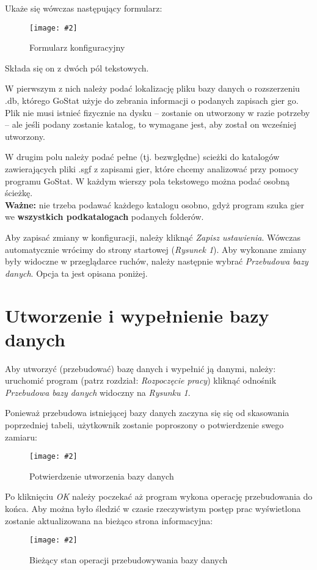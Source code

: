 \documentclass[10pt,leqno]{article}
\newcommand{\myimage}[3]{
  \begin{figure}[h!]
    \centering
      \texttt{[image: \#2]}
  \caption{#3}
  \end{figure}
}
\begin{document}
Ukaże się wówczas następujący formularz:

\myimage{0.4}{formularz.png}{Formularz konfiguracyjny}

Składa się on z dwóch pól tekstowych. 

W pierwszym z nich należy podać lokalizację pliku bazy danych o rozszerzeniu .db, którego GoStat użyje do zebrania informacji o podanych zapisach gier go.
Plik nie musi istnieć fizycznie na dysku -- zostanie on utworzony w razie potrzeby -- ale jeśli podany zostanie katalog, to wymagane jest, aby został on
wcześniej utworzony.

W drugim polu należy podać pełne (tj. bezwględne) scieżki do katalogów zawierających pliki .sgf z zapisami gier, które chcemy analizować przy pomocy
programu GoStat. W każdym wierszy pola tekstowego można podać osobną ścieżkę. \\
\textbf{Ważne:} nie trzeba podawać każdego katalogu osobno, gdyż program szuka gier we \textbf{wszystkich podkatalogach} podanych folderów.

Aby zapisać zmiany w konfiguracji, należy kliknąć \emph{Zapisz ustawienia}. Wówczas automatycznie wrócimy do strony startowej (\emph{Rysunek 1}). 
Aby wykonane zmiany były widoczne w przeglądarce ruchów, należy następnie wybrać \emph{Przebudowa bazy danych}. Opcja ta jest opisana poniżej.

\newpage

\section{Utworzenie i wypełnienie bazy danych}
Aby utworzyć (przebudować) bazę danych i wypełnić ją danymi, należy: 
  uruchomić program (patrz rozdział: \emph{Rozpoczęcie pracy})
  kliknąć odnośnik \emph{Przebudowa bazy danych} widoczny na \emph{Rysunku 1}.

Ponieważ przebudowa istniejącej bazy danych zaczyna się się od skasowania poprzedniej tabeli, użytkownik zostanie
poproszony o potwierdzenie swego zamiaru:

\myimage{1.0}{potwierdzenie.png}{Potwierdzenie utworzenia bazy danych}

Po kliknięciu \emph{OK} należy poczekać aż program wykona operację przebudowania do końca. 
Aby można było śledzić w czasie rzeczywistym postęp prac wyświetlona zostanie aktualizowana na bieżąco strona informacyjna:

\myimage{0.4}{status.png}{Bieżący stan operacji przebudowywania bazy danych}
\end{document}

